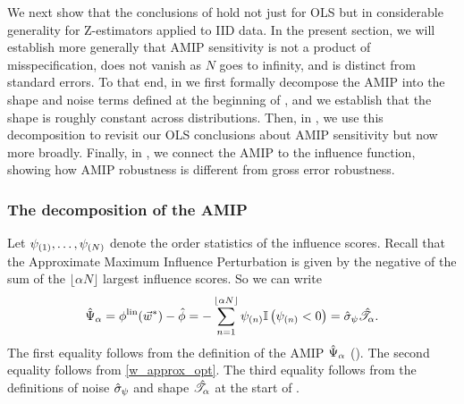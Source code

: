 \def\tz{T_Z}
\def\tfun{T_\thetafun}
\def\fhat{\hat{F}_N}
\def\flim{F_{\infty}}
\def\falt{F_{alt}}
\def\fbase{F_{0}}
\def\ic{\mathrm{IF}}
\def\ichat#1{\widehat{IC}_{#1}}
\def\wsum{N_{\w}}

We next show that the conclusions of  hold not
just for OLS but in considerable generality for Z-estimators applied to
IID data. In the present section, we will
establish more generally that AMIP sensitivity is not a product of
misspecification, does not vanish as $N$ goes to infinity, and is distinct from
standard errors. To that end, in  we first formally
decompose the AMIP into the shape and noise terms defined at the beginning of
, and we establish that the shape is roughly constant across
distributions. Then, in , we use this
decomposition to revisit our OLS conclusions about AMIP sensitivity but now more
broadly. Finally, in , we connect the AMIP
to the influence function, showing how AMIP robustness is different from gross
error robustness.



\subsubsection{The decomposition of the AMIP}


%
Let $\psi_{(1)}, \ldots, \psi_{(N)}$ denote the order statistics of the
influence scores.  Recall that the Approximate Maximum Influence Perturbation is
given by the negative of the sum of the $\lfloor \alpha N \rfloor$ largest
influence scores.  So we can write
%
\begin{align}
%
\amip{\alpha} = \thetafunlin(\w^{*}) - \thetafunhat =
- \sum_{n=1}^{\lfloor \alpha N \rfloor} \infl_{(n)} \ind{\infl_{(n)} < 0} =
\inflscale \shape.
%
\end{align}
%
The first equality follows from the definition of the AMIP $\hat{\Psi}_{\alpha}$
(). The second equality follows from
\eqref{w_approx_opt}. The third equality follows from the definitions of noise
$\hat{\sigma}_{\psi}$ and shape $\hat{\mathscr{T}}_\alpha$ at the start of .


